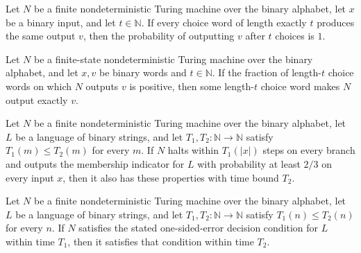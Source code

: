 \begin{theorem}
\label{Turing.FinNDTM.outputProb_eq_one}
\leanok
{}
Let $N$ be a finite nondeterministic Turing machine over the binary alphabet, let $x$ be
a binary input, and let $t\in\mathbb{N}$. If every choice word of length exactly $t$
produces the same output $v$, then the probability of outputting $v$ after $t$ choices
is $1$.
\end{theorem}

\begin{theorem}
\label{Turing.FinNDTM.exists_outputWith_of_outputProb_pos}
\leanok
{}
Let $N$ be a finite-state nondeterministic Turing machine over the binary alphabet, and
let $x,v$ be binary words and $t\in\mathbb{N}$. If the fraction of length-$t$ choice
words on which $N$ outputs $v$ is positive, then some length-$t$ choice word makes $N$
output exactly $v$.
\end{theorem}

\begin{theorem}
\label{Turing.FinNDTM.BPDecidesInTime.mono}
\leanok
{}
Let $N$ be a finite nondeterministic Turing machine over the binary alphabet, let $L$ be
a language of binary strings, and let $T_1,T_2\colon\mathbb{N}\to\mathbb{N}$ satisfy
$T_1(m)\le T_2(m)$ for every $m$. If $N$ halts within $T_1(|x|)$ steps on every branch
and outputs the membership indicator for $L$ with probability at least $2/3$ on every
input $x$, then it also has these properties with time bound $T_2$.
\end{theorem}

\begin{theorem}
\label{Turing.FinNDTM.RDecidesInTime.mono}
\leanok
{}
Let $N$ be a finite nondeterministic Turing machine over the binary alphabet, let $L$ be
a language of binary strings, and let $T_1,T_2:\mathbb{N}\to\mathbb{N}$ satisfy
$T_1(n)\le T_2(n)$ for every $n$. If $N$ satisfies the stated one-sided-error decision
condition for $L$ within time $T_1$, then it satisfies that condition within time $T_2$.
\end{theorem}

